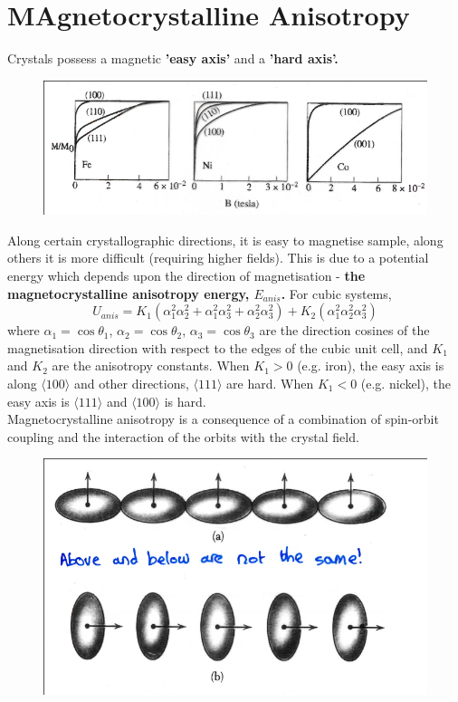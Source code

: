 \documentclass[a4paper, 11pt, normalem]{report}
\begin{document}
\section{MAgnetocrystalline Anisotropy}
Crystals possess a magnetic \textbf{'easy axis'} and a \textbf{'hard axis'.}
\begin{figure}[H]
    \centering
    \includegraphics[scale=0.5]{axes.png}
\end{figure}
Along certain crystallographic directions, it is easy to magnetise sample, along others it is more difficult (requiring higher fields).
This is due to a potential energy which depends upon the direction of magnetisation - \textbf{the magnetocrystalline anisotropy energy, $E_{anis}$.}
For cubic systems, 
\begin{equation}
    U_{anis} = K_1(\alpha_1^2\alpha_2^2 + \alpha_1^2\alpha_3^2 + \alpha_2^2\alpha_3^2) + K_2(\alpha_1^2\alpha_2^2\alpha_3^2)
\end{equation}
where $\alpha_1 = \cos\theta_1$, $\alpha_2=\cos\theta_2$, $\alpha_3=\cos\theta_3$ are the direction cosines of the magnetisation direction with respect to the edges of the cubic unit cell, and $K_1$ and $K_2$ are the anisotropy constants.
When $K_1>0$ (e.g. iron), the easy axis is along $\langle 100\rangle$ and other directions, $\langle 111\rangle$ are hard.
When $K_1<0$ (e.g. nickel), the easy axis is $\langle111\rangle$ and $\langle100\rangle$ is hard.\\
Magnetocrystalline anisotropy is a consequence of a combination of spin-orbit coupling and the interaction of the orbits with the crystal field.
\begin{figure}[H]
    \centering
    \includegraphics[scale=0.5]{anis.png}
\end{figure}
\end{document}
